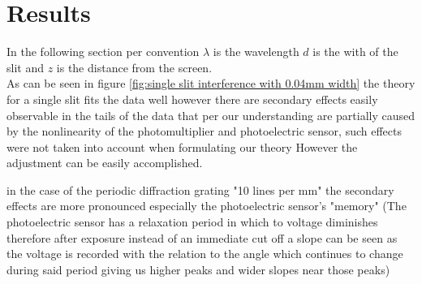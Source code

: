 \section{Results}
In the following section per convention $\lambda$ is the wavelength $d$ is the with of the slit and $z$ is the distance from the screen.\\
As can be seen in figure \ref{fig:single slit interference with 0.04mm width} the theory for a single slit fits the data well however there are
secondary effects easily observable in the tails of the data that per our understanding are partially caused by the nonlinearity of the
photomultiplier and photoelectric sensor, such effects were not taken into account when formulating our theory
However the adjustment can be easily accomplished.


in the case of the periodic diffraction grating "10 lines per mm" the secondary effects are more pronounced especially
the photoelectric sensor's "memory" (The photoelectric sensor has a relaxation period in which to voltage diminishes
therefore after exposure instead of an immediate cut off a slope can be seen as the voltage is recorded with the relation
to the angle which continues to change during said period giving us higher peaks and wider slopes near those peaks)
